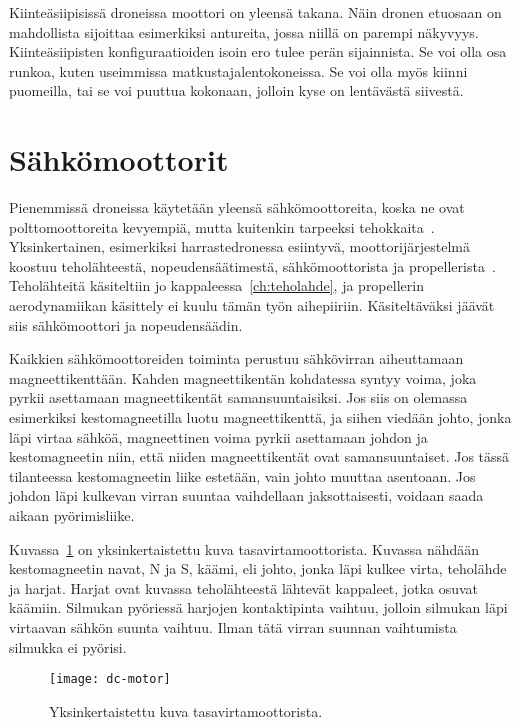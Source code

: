 
Kiinteäsiipisissä droneissa moottori on yleensä takana. Näin dronen etuosaan on
mahdollista sijoittaa esimerkiksi antureita, jossa niillä on parempi näkyvyys.
Kiinteäsiipisten konfiguraatioiden isoin ero tulee perän sijainnista. Se voi
olla osa runkoa, kuten useimmissa matkustajalentokoneissa.  Se voi olla myös
kiinni puomeilla, tai se voi puuttua kokonaan, jolloin kyse on lentävästä
siivestä.~\cite{Austin2010}


\section{Sähkömoottorit}
Pienemmissä droneissa käytetään yleensä sähkömoottoreita, koska ne
ovat polttomoottoreita kevyempiä, mutta kuitenkin tarpeeksi
tehokkaita~\cite{Austin2010}. Yksinkertainen, esimerkiksi harrastedronessa
esiintyvä, moottorijärjestelmä koostuu teholähteestä, nopeudensäätimestä,
sähkömoottorista ja propellerista~\cite{Gabriel2011}. Teholähteitä käsiteltiin
jo kappaleessa~\ref{ch:teholahde}, ja propellerin aerodynamiikan käsittely ei
kuulu tämän työn aihepiiriin. Käsiteltäväksi jäävät siis sähkömoottori ja
nopeudensäädin.

Kaikkien sähkömoottoreiden toiminta perustuu sähkövirran aiheuttamaan
magneettikenttään. Kahden magneettikentän kohdatessa syntyy voima, joka pyrkii
asettamaan magneettikentät samansuuntaisiksi. Jos siis on olemassa esimerkiksi
kestomagneetilla luotu magneettikenttä, ja siihen viedään johto, jonka läpi
virtaa sähköä, magneettinen voima pyrkii asettamaan johdon ja kestomagneetin
niin, että niiden magneettikentät ovat samansuuntaiset. Jos tässä tilanteessa
kestomagneetin liike estetään, vain johto muuttaa asentoaan. Jos johdon läpi
kulkevan virran suuntaa vaihdellaan jaksottaisesti, voidaan saada aikaan
pyörimisliike.~\cite{Gottlieb1997}

Kuvassa~\ref{fig:dc-motor} on yksinkertaistettu kuva tasavirtamoottorista.
Kuvassa nähdään kestomagneetin navat, N ja S, käämi, eli johto, jonka läpi
kulkee virta, teholähde ja harjat. Harjat ovat kuvassa teholähteestä lähtevät
kappaleet, jotka osuvat käämiin. Silmukan pyöriessä harjojen kontaktipinta
vaihtuu, jolloin silmukan läpi virtaavan sähkön suunta vaihtuu.  Ilman tätä
virran suunnan vaihtumista silmukka ei pyörisi.~\cite{Gottlieb1997}
\begin{figure}[H]
  \begin{center}
    \texttt{[image: dc-motor]}
  \end{center}
  \caption{Yksinkertaistettu kuva tasavirtamoottorista.~\cite{Gottlieb1997}}
\label{fig:dc-motor}
\end{figure}

